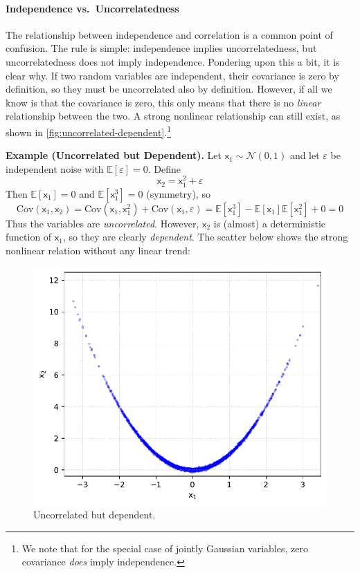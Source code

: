 \paragraph*{Independence vs.\ Uncorrelatedness}
The relationship between independence and correlation is a common point of confusion. The rule is simple: independence implies uncorrelatedness, but uncorrelatedness does not imply independence. Pondering upon this a bit, it is clear why. If two random variables are independent, their covariance is zero by definition, so they must be uncorrelated also by definition. However, if all we know is that the covariance is zero, this only means that there is no \emph{linear} relationship between the two. A strong nonlinear relationship can still exist, as shown in \autoref{fig:uncorrelated-dependent}.\footnote{We note that for the special case of jointly Gaussian variables, zero covariance \emph{does} imply independence.}

\begin{exampleBox}
    \textbf{Example (Uncorrelated but Dependent).}
    Let $\mathsf{x}_1 \sim \mathcal{N}(0,1)$ and let $\varepsilon$ be independent noise with $\mathbb{E}[\varepsilon]=0$.
    Define
    \begin{equation}
    \mathsf{x}_2 = \mathsf{x}_1^2 + \varepsilon
    \end{equation}
    Then $\mathbb{E}[\mathsf{x}_1]=0$ and $\mathbb{E}[\mathsf{x}_1^3]=0$ (symmetry), so
    \begin{equation}
    \mathrm{Cov}(\mathsf{x}_1,\mathsf{x}_2)
    = \mathrm{Cov}(\mathsf{x}_1,\mathsf{x}_1^2) + \mathrm{Cov}(\mathsf{x}_1,\varepsilon)
    = \mathbb{E}[\mathsf{x}_1^3] - \mathbb{E}[\mathsf{x}_1]\mathbb{E}[\mathsf{x}_1^2] + 0
    = 0
    \end{equation}
    Thus the variables are \emph{uncorrelated}. However, $\mathsf{x}_2$ is (almost) a deterministic function of $\mathsf{x}_1$, so they are clearly \emph{dependent}. The scatter below shows the strong nonlinear relation without any linear trend:
    \begin{figure}[H]
        \centering
        \includegraphics[width=.4\textwidth]{figs/probability/uncorrelated_dependent.pdf}
        \caption{Uncorrelated but dependent.}
        \label{fig:uncorrelated-dependent}
    \end{figure}
\end{exampleBox}

